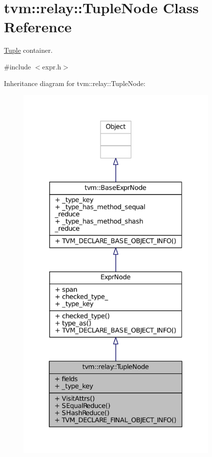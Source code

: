 \hypertarget{classtvm_1_1relay_1_1TupleNode}{}\section{tvm\+:\+:relay\+:\+:Tuple\+Node Class Reference}
\label{classtvm_1_1relay_1_1TupleNode}


\hyperlink{classtvm_1_1relay_1_1Tuple}{Tuple} container.  




{\ttfamily \#include $<$expr.\+h$>$}



Inheritance diagram for tvm\+:\+:relay\+:\+:Tuple\+Node\+:
\nopagebreak
\begin{figure}[H]
\begin{center}
\leavevmode
\includegraphics[height=550pt]{classtvm_1_1relay_1_1TupleNode__inherit__graph}
\end{center}
\end{figure}


